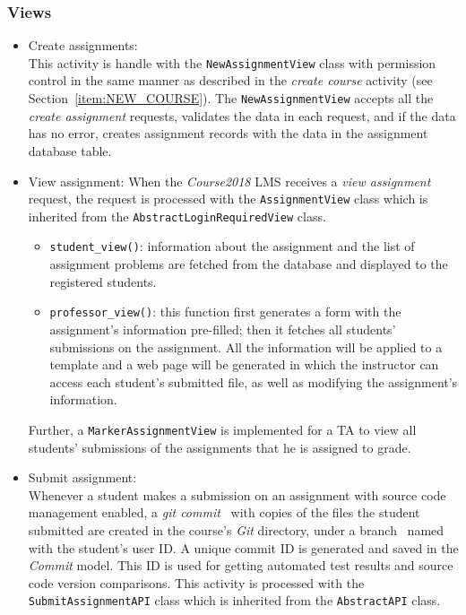 \subsubsection{Views}
\begin{itemize}
    \item Create assignments: \\
        This activity is handle with the \texttt{NewAssignmentView} class with 
        permission control in the same manner as described in the
        \emph{create course} activity (see Section~\ref{item:NEW_COURSE}).
        The \texttt{NewAssignmentView} accepts all the \emph{create assignment}
        requests, validates the data in each request, and if the data has no
        error, creates assignment records with the data in the assignment
        database table.

    \item View assignment:
        When the \emph{Course2018} LMS receives a \emph{view assignment}
        request, the request is processed with the \texttt{AssignmentView}
        class which is inherited from the \texttt{AbstractLoginRequiredView}
        class.
        \begin{itemize}
            \item \texttt{student\_view()}:
                information about the assignment and the list of assignment
                problems are fetched from the database and displayed to the 
                registered students.
            \item \texttt{professor\_view()}:
            \label{item:PROF_VIEW}
                this function first generates a form with the assignment's
                information pre-filled; then it fetches all students'
                submissions on the assignment. All the information will
                be applied to a template and a web page will be generated in
                which the instructor can access each student's submitted file,
                as well as modifying the assignment's information.
        \end{itemize}

        Further, a \texttt{MarkerAssignmentView} is implemented for a TA to
        view all students' submissions of the assignments that he is assigned to
        grade.

    \item Submit assignment: \\
        Whenever a student makes a submission on an assignment with source
        code management enabled, 
        a \emph{git commit}~\citep[Chapter 2]{progit} with copies of the files
        the student submitted are created in the course's \emph{Git} directory,
        under a branch~\cite[Chapter 3]{progit} named with the student's user
        ID\null.
        A unique commit ID is generated and saved in the \emph{Commit} model.
        This ID is used for getting automated test results and
        source code version comparisons.
        This activity is processed with the \texttt{SubmitAssignmentAPI} class
        which is inherited from the \texttt{AbstractAPI} class.
\end{itemize}

